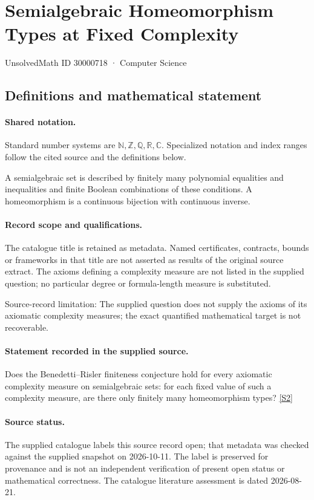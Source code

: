 \documentclass[11pt]{article}
\newcommand{\sref}[2]{\hyperlink{source:#1:#2}{[S#2]}}
\begin{document}
\setcounter{section}{30000717}
\section{Semialgebraic Homeomorphism Types at Fixed Complexity}\label{30000718}
{\small\sffamily UnsolvedMath ID 30000718 · Computer Science}
\subsection{Definitions and mathematical statement}

\paragraph{Shared notation.}Standard number systems are $\mathbb N,\mathbb Z,\mathbb Q,\mathbb R,\mathbb C$. Specialized notation and index ranges follow the cited source and the definitions below.


A semialgebraic set is described by finitely many polynomial equalities and inequalities and finite Boolean combinations of these conditions. A homeomorphism is a continuous bijection with continuous inverse.
\paragraph{Record scope and qualifications.}
The catalogue title is retained as metadata. Named certificates, contracts, bounds or frameworks in that title are not asserted as results of the original source extract.
The axioms defining a complexity measure are not listed in the supplied question; no particular degree or formula-length measure is substituted.

Source-record limitation: The supplied question does not supply the axioms of its axiomatic complexity measures; the exact quantified mathematical target is not recoverable.
\paragraph{Statement recorded in the supplied source.}
Does the Benedetti–Risler finiteness conjecture hold for every axiomatic complexity measure on semialgebraic sets: for each fixed value of such a complexity measure, are there only finitely many homeomorphism types? \sref{30000718}{2}
\paragraph{Source status.}
The supplied catalogue labels this source record open; that metadata was checked against the supplied snapshot on 2026-10-11. The label is preserved for provenance and is not an independent verification of present open status or mathematical correctness. The catalogue literature assessment is dated 2026-08-21.
\end{document}
